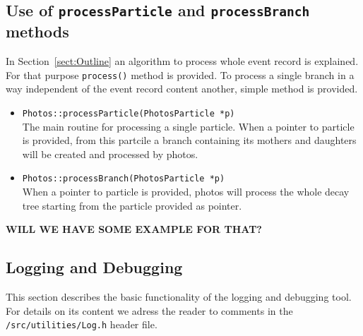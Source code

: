 \documentclass[]{Photos_interface_design}
\begin{document}
\subsection{{\bf Use of {\tt processParticle} and {\tt processBranch} methods }}
\label{PHOTOSgun}

In Section~\ref{sect:Outline} an algorithm to process whole event record is explained.
For that purpose {\tt process()} method is provided.
To process a single branch in a way independent of the
event record content another, simple method is provided.

\begin{itemize}
  \item {\tt Photos::processParticle(PhotosParticle *p) } \hfill \\
		The main routine for processing a single particle. When a pointer to particle
		is provided, from this partcile a branch containing its mothers and daughters
		will be created and processed by photos.
  \item {\tt Photos::processBranch(PhotosParticle *p) } \hfill \\
 		When a pointer to particle is provided, photos will process the whole decay
		tree starting from the particle	provided as pointer.
\end{itemize}

{\bf WILL WE HAVE SOME EXAMPLE FOR THAT?}

\subsection{Logging and Debugging}
\label{App:Logging}
This section describes the basic functionality of the logging and debugging tool.
For details on its content we adress the reader to comments in the {\tt /src/utilities/Log.h} header file.
\end{document}
